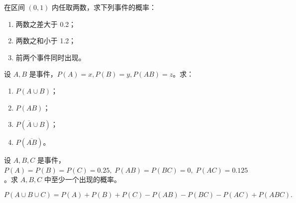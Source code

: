\begin{exercise}
在区间 $(0,1)$ 内任取两数，求下列事件的概率：
\begin{enumerate}
  \item 两数之差大于 0.2；
  \item 两数之和小于 1.2；
  \item 前两个事件同时出现。
\end{enumerate}
\end{exercise}

\begin{exercise}
设 $A,B$ 是事件，$P(A)=x, P(B)=y, P(AB)=z$。求：
\begin{enumerate}
  \item $P(A \cup B)$；
  \item $P(AB)$；
  \item $P(\overline{A} \cup B)$；
  \item $P(\overline{AB})$。
\end{enumerate}
\end{exercise}

\begin{exercise}
设 $A,B,C$ 是事件，$P(A)=P(B)=P(C)=0.25,\; P(AB)=P(BC)=0,\; P(AC)=0.125$。求 $A,B,C$ 中至少一个出现的概率。
\begin{dxtips}
    

\[
P(A \cup B \cup C) 
= P(A) + P(B) + P(C) 
- P(AB) - P(BC) - P(AC) 
+ P(ABC).
\]
\end{dxtips}

\end{exercise}

